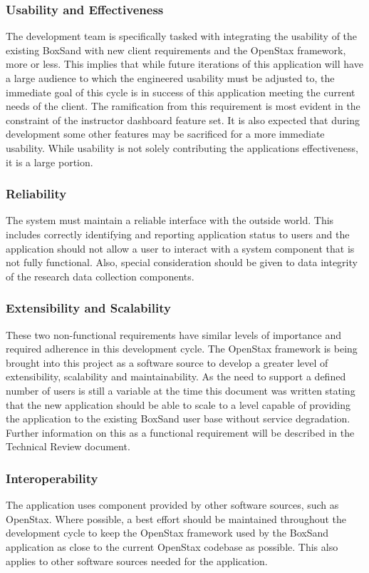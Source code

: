 \documentclass[onecolumn, draftclsnofoot,10pt, compsoc]{IEEEtran}
\begin{document}
\subsubsection{Usability and Effectiveness}
The development team is specifically tasked with integrating the usability of the existing BoxSand with new client requirements and the OpenStax framework, more or less. This implies that while future iterations of this application will have a large audience to which the engineered usability must be adjusted to, the immediate goal of this cycle is in success of this application meeting the current needs of the client. The ramification from this requirement is most evident in the constraint of the instructor dashboard feature set. It is also expected that during development some other features may be sacrificed for a more immediate usability. While usability is not solely contributing the applications effectiveness, it is a large portion.

\subsubsection{Reliability}
The system must maintain a reliable interface with the outside world. This includes correctly identifying and reporting application status to users and the application should not allow a user to interact with a system component that is not fully functional. Also, special consideration should be given to data integrity of the research data collection components.

\subsubsection{Extensibility and Scalability}
These two non-functional requirements have similar levels of importance and required adherence in this development cycle. The OpenStax framework is being brought into this project as a software source to develop a greater level of extensibility, scalability and maintainability. As the need to support a defined number of users is still a variable at the time this document was written stating that the new application should be able to scale to a level capable of providing the application to the existing BoxSand user base without service degradation. Further information on this as a functional requirement will be described in the Technical Review document.

\subsubsection{Interoperability}
The application uses component provided by other software sources, such as OpenStax. Where possible, a best effort should be maintained throughout the development cycle to keep the OpenStax framework used by the BoxSand application as close to the current OpenStax codebase as possible. This also applies to other software sources needed for the application. 
\end{document}

